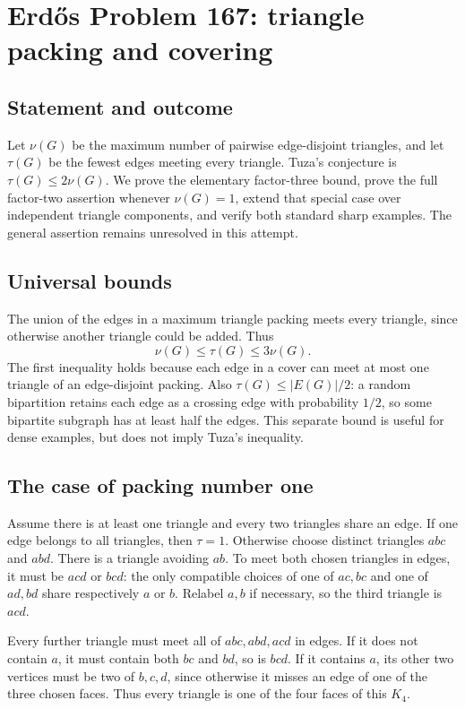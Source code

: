 \section*{Erd\H{o}s Problem 167: triangle packing and covering}
\subsection*{Statement and outcome}
Let $\nu(G)$ be the maximum number of pairwise edge-disjoint triangles, and let $\tau(G)$ be the fewest edges meeting every triangle. Tuza's conjecture is $\tau(G)\le2\nu(G)$.
We prove the elementary factor-three bound, prove the full factor-two assertion whenever $\nu(G)=1$, extend that special case over independent triangle components, and verify both standard sharp examples. The general assertion remains unresolved in this attempt.

\subsection*{Universal bounds}
The union of the edges in a maximum triangle packing meets every triangle, since otherwise another triangle could be added. Thus
\[
 \nu(G)\le\tau(G)\le3\nu(G).
\]
The first inequality holds because each edge in a cover can meet at most one triangle of an edge-disjoint packing.
Also $\tau(G)\le |E(G)|/2$: a random bipartition retains each edge as a crossing edge with probability $1/2$, so some bipartite subgraph has at least half the edges. This separate bound is useful for dense examples, but does not imply Tuza's inequality.

\subsection*{The case of packing number one}
Assume there is at least one triangle and every two triangles share an edge. If one edge belongs to all triangles, then $\tau=1$. Otherwise choose distinct triangles $abc$ and $abd$. There is a triangle avoiding $ab$. To meet both chosen triangles in edges, it must be $acd$ or $bcd$: the only compatible choices of one of $ac,bc$ and one of $ad,bd$ share respectively $a$ or $b$. Relabel $a,b$ if necessary, so the third triangle is $acd$.

Every further triangle must meet all of $abc,abd,acd$ in edges. If it does not contain $a$, it must contain both $bc$ and $bd$, so is $bcd$. If it contains $a$, its other two vertices must be two of $b,c,d$, since otherwise it misses an edge of one of the three chosen faces. Thus every triangle is one of the four faces of this $K_4$.

